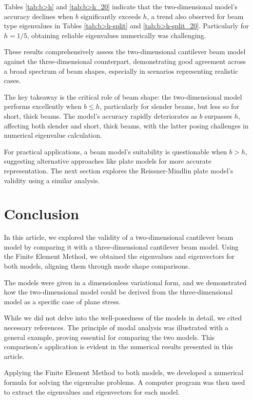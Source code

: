 Tables \ref{tab:b>h} and \ref{tab:b>h_20} indicate that the two-dimensional model's accuracy declines when $b$ significantly exceeds $h$, a trend also observed for beam type eigenvalues in Tables \ref{tab:b>h-split} and \ref{tab:b>h-split_20}. Particularly for $h=1/5$, obtaining reliable eigenvalues numerically was challenging.

These results comprehensively assess the two-dimensional cantilever beam model against the three-dimensional counterpart, demonstrating good agreement across a broad spectrum of beam shapes, especially in scenarios representing realistic cases.

The key takeaway is the critical role of beam shape: the two-dimensional model performs excellently when $b \leq h$, particularly for slender beams, but less so for short, thick beams. The model's accuracy rapidly deteriorates as $b$ surpasses $h$, affecting both slender and short, thick beams, with the latter posing challenges in numerical eigenvalue calculation.

For practical applications, a beam model's suitability is questionable when $b > h$, suggesting alternative approaches like plate models for more accurate representation. The next section explores the Reissner-Mindlin plate model's validity using a similar analysis.

\section{Conclusion}
In this article, we explored the validity of a two-dimensional cantilever beam model by comparing it with a three-dimensional cantilever beam model. Using the Finite Element Method, we obtained the eigenvalues and eigenvectors for both models, aligning them through mode shape comparisons.

The models were given in a dimensionless variational form, and we demonstrated how the two-dimensional model could be derived from the three-dimensional model as a specific case of plane stress.

While we did not delve into the well-posedness of the models in detail, we cited necessary references. The principle of modal analysis was illustrated with a general example, proving essential for comparing the two models. This comparison's application is evident in the numerical results presented in this article.

Applying the Finite Element Method to both models, we developed a numerical formula for solving the eigenvalue problems. A computer program was then used to extract the eigenvalues and eigenvectors for each model.

